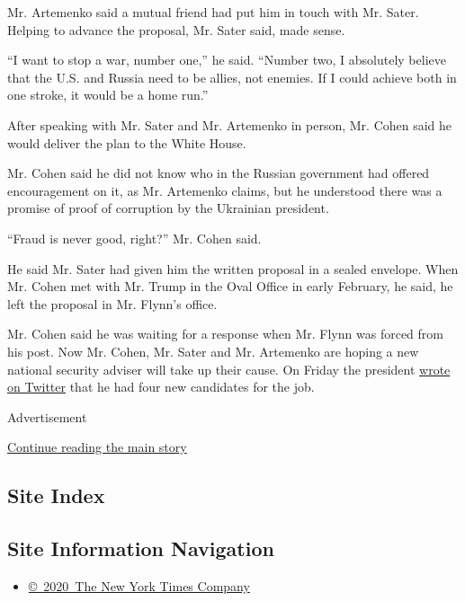 Mr. Artemenko said a mutual friend had put him in touch with Mr. Sater.
Helping to advance the proposal, Mr. Sater said, made sense.

``I want to stop a war, number one,'' he said. ``Number two, I
absolutely believe that the U.S. and Russia need to be allies, not
enemies. If I could achieve both in one stroke, it would be a home
run.''

After speaking with Mr. Sater and Mr. Artemenko in person, Mr. Cohen
said he would deliver the plan to the White House.

Mr. Cohen said he did not know who in the Russian government had offered
encouragement on it, as Mr. Artemenko claims, but he understood there
was a promise of proof of corruption by the Ukrainian president.

``Fraud is never good, right?'' Mr. Cohen said.

He said Mr. Sater had given him the written proposal in a sealed
envelope. When Mr. Cohen met with Mr. Trump in the Oval Office in early
February, he said, he left the proposal in Mr. Flynn's office.

Mr. Cohen said he was waiting for a response when Mr. Flynn was forced
from his post. Now Mr. Cohen, Mr. Sater and Mr. Artemenko are hoping a
new national security adviser will take up their cause. On Friday the
president
\href{https://twitter.com/realDonaldTrump/status/832579442790772736}{wrote
on Twitter} that he had four new candidates for the job.

Advertisement

\protect\hyperlink{after-bottom}{Continue reading the main story}

\hypertarget{site-index}{%
\subsection{Site Index}\label{site-index}}

\hypertarget{site-information-navigation}{%
\subsection{Site Information
Navigation}\label{site-information-navigation}}

\begin{itemize}
\tightlist
\item
  \href{https://help.nytimes.com/hc/en-us/articles/115014792127-Copyright-notice}{©~2020~The
  New York Times Company}
\end{itemize}

